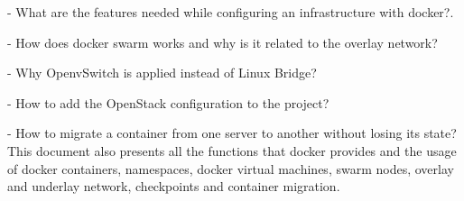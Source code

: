 - What are the features needed while configuring an infrastructure with docker?.

- How does docker swarm works and why is it related to the overlay network?

- Why OpenvSwitch is applied instead of Linux Bridge?

- How to add the OpenStack configuration to the project?

- How to migrate a container from one server to another without losing its state?\\

This document also presents all the functions that docker provides and the usage of docker containers, namespaces, docker virtual machines, swarm nodes, overlay and underlay network, checkpoints and container migration.

 



\endgroup			

\vfill